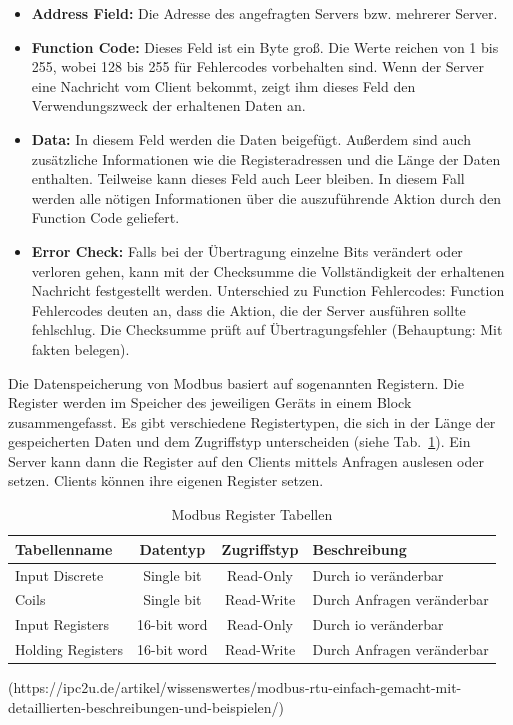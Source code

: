\begin{itemize}
	\item \textbf{Address Field:} Die Adresse des angefragten Servers bzw. mehrerer Server.
	\item \textbf{Function Code:} Dieses Feld ist ein Byte groß. Die Werte reichen von 1 bis 255, wobei 128 bis 255 für Fehlercodes vorbehalten sind. Wenn der Server eine Nachricht vom Client bekommt, zeigt ihm dieses Feld den Verwendungszweck der erhaltenen Daten an. 
	\item \textbf{Data:} In diesem Feld werden die Daten beigefügt. Außerdem sind auch zusätzliche Informationen wie die Registeradressen und die Länge der Daten enthalten. Teilweise kann dieses Feld auch Leer bleiben. In diesem Fall werden alle nötigen Informationen über die auszuführende Aktion durch den Function Code geliefert.
	\item \textbf{Error Check:} Falls bei der Übertragung einzelne Bits verändert oder verloren gehen, kann mit der Checksumme die Vollständigkeit der erhaltenen Nachricht festgestellt werden.
	Unterschied zu Function Fehlercodes: Function Fehlercodes deuten an, dass die Aktion, die der Server ausführen sollte fehlschlug. Die Checksumme prüft auf Übertragungsfehler (Behauptung: Mit fakten belegen).
\end{itemize}

Die Datenspeicherung von Modbus basiert auf sogenannten Registern. Die Register werden im Speicher des jeweiligen Geräts in einem Block zusammengefasst. Es gibt verschiedene Registertypen, die sich in der Länge der gespeicherten Daten und dem Zugriffstyp unterscheiden (siehe Tab.~\ref{tab:modbus_register_tabellen}). \newline Ein Server kann dann die Register auf den Clients mittels Anfragen auslesen oder setzen. Clients können ihre eigenen Register setzen.
\begin{table}[H]
	\caption{Modbus Register Tabellen \label{tab:modbus_register_tabellen}}
	\begin{tabularx}{\textwidth}{@{}l|c|c|X@{}}
		\toprule
		\textbf{Tabellenname} & \textbf{Datentyp} & \textbf{Zugriffstyp} & \textbf{Beschreibung} \\
		\midrule
		Input Discrete & Single bit & Read-Only & Durch \acf{io} veränderbar \\
		Coils & Single bit & Read-Write & Durch Anfragen veränderbar \\
		Input Registers & 16-bit word & Read-Only & Durch \acs{io} veränderbar \\
		Holding Registers & 16-bit word & Read-Write & Durch Anfragen veränderbar \\
		\bottomrule
	\end{tabularx}
\end{table}
(https://ipc2u.de/artikel/wissenswertes/modbus-rtu-einfach-gemacht-mit-detaillierten-beschreibungen-und-beispielen/)

